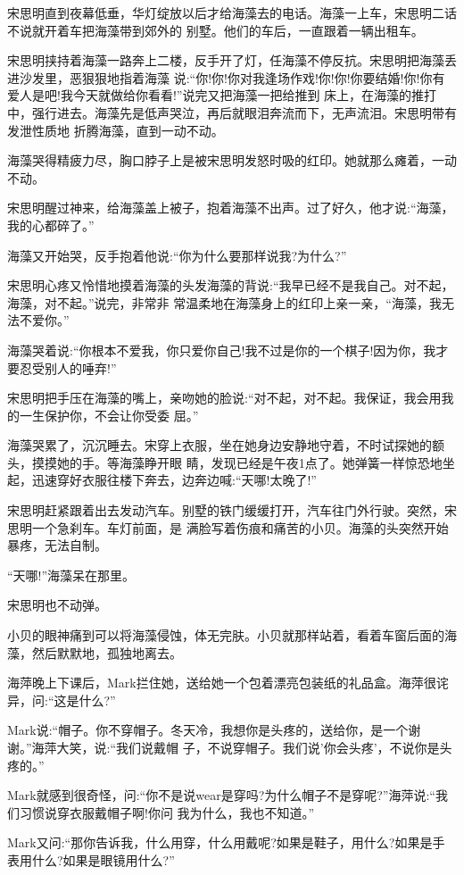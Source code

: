 \documentclass[11pt,a4paper,onecolumn]{article}
\begin{document}
宋思明直到夜幕低垂，华灯绽放以后才给海藻去的电话。海藻一上车，宋思明二话不说就开着车把海藻带到郊外的
别墅。他们的车后，一直跟着一辆出租车。

宋思明挟持着海藻一路奔上二楼，反手开了灯，任海藻不停反抗。宋思明把海藻丢进沙发里，恶狠狠地指着海藻
说:``你!你!你对我逢场作戏!你!你!你要结婚!你!你有爱人是吧!我今天就做给你看看!''说完又把海藻一把给推到
床上，在海藻的推打中，强行进去。海藻先是低声哭泣，再后就眼泪奔流而下，无声流泪。宋思明带有发泄性质地
折腾海藻，直到一动不动。

海藻哭得精疲力尽，胸口脖子上是被宋思明发怒时吸的红印。她就那么瘫着，一动不动。

宋思明醒过神来，给海藻盖上被子，抱着海藻不出声。过了好久，他才说:``海藻，我的心都碎了。''

海藻又开始哭，反手抱着他说:``你为什么要那样说我?为什么?''

宋思明心疼又怜惜地摸着海藻的头发海藻的背说:``我早已经不是我自己。对不起，海藻，对不起。''说完，非常非
常温柔地在海藻身上的红印上亲一亲，``海藻，我无法不爱你。''

海藻哭着说:``你根本不爱我，你只爱你自己!我不过是你的一个棋子!因为你，我才要忍受别人的唾弃!''

宋思明把手压在海藻的嘴上，亲吻她的脸说:``对不起，对不起。我保证，我会用我的一生保护你，不会让你受委
屈。''

海藻哭累了，沉沉睡去。宋穿上衣服，坐在她身边安静地守着，不时试探她的额头，摸摸她的手。等海藻睁开眼
睛，发现已经是午夜1点了。她弹簧一样惊恐地坐起，迅速穿好衣服往楼下奔去，边奔边喊:``天哪!太晚了!''

宋思明赶紧跟着出去发动汽车。别墅的铁门缓缓打开，汽车往门外行驶。突然，宋思明一个急刹车。车灯前面，是
满脸写着伤痕和痛苦的小贝。海藻的头突然开始暴疼，无法自制。

``天哪!''海藻呆在那里。

宋思明也不动弹。

小贝的眼神痛到可以将海藻侵蚀，体无完肤。小贝就那样站着，看着车窗后面的海藻，然后默默地，孤独地离去。

海萍晚上下课后，Mark拦住她，送给她一个包着漂亮包装纸的礼品盒。海萍很诧异，问:``这是什么?''

Mark说:``帽子。你不穿帽子。冬天冷，我想你是头疼的，送给你，是一个谢谢。''海萍大笑，说:``我们说戴帽
子，不说穿帽子。我们说'你会头疼'，不说你是头疼的。''

Mark就感到很奇怪，问:``你不是说wear是穿吗?为什么帽子不是穿呢?''海萍说:``我们习惯说穿衣服戴帽子啊!你问
我为什么，我也不知道。''

Mark又问:``那你告诉我，什么用穿，什么用戴呢?如果是鞋子，用什么?如果是手表用什么?如果是眼镜用什么?''
\end{document}
